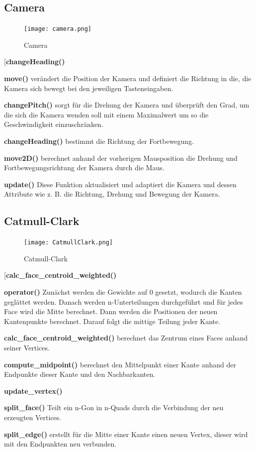 \subsection{Camera}
				
	\begin{figure}[H]
	\centering
	\texttt{[image: camera.png]}
	\caption{Camera}
	\label{fig3}
	\end{figure}

	\begin{labeling}[]{[\textbf{changeHeading()}}%
	\item[\textbf{move()}] verändert die Position der Kamera und definiert die Richtung in die, die Kamera sich bewegt bei den jeweiligen Tasteneingaben.
	\item[\textbf{changePitch()}] sorgt für die Drehung der Kamera und überprüft den Grad, um die sich die Kamera wenden soll mit einem Maximalwert um so die Geschwindigkeit einzuschränken.
	\item[\textbf{changeHeading()}] bestimmt die Richtung der Fortbewegung.
	\item[\textbf{move2D()}] berechnet anhand der vorherigen Mausposition die Drehung und Fortbewegungsrichtung der Kamera durch die Maus.
	\item[\textbf{update()}] Diese Funktion aktualisiert und adaptiert die Kamera und dessen Attribute wie z. B. die Richtung, Drehung und Bewegung der Kamera.
	\end{labeling}
	
\subsection{Catmull-Clark}


\begin{figure}[H]
	\centering
	\texttt{[image: CatmullClark.png]}
	\caption{Catmull-Clark}
	\label{fig4}
	\end{figure}

	\begin{labeling}[]{[\textbf{calc\_face\_centroid\_weighted()}}%
	\item[\textbf{operator()}] Zunächst werden die Gewichte auf 0 gesetzt, wodurch die Kanten geglättet werden. Danach werden n-Unterteilungen durchgeführt und für jedes Face wird die Mitte berechnet. Dann werden die Positionen der neuen Kantenpunkte berechnet. Darauf folgt die mittige Teilung jeder Kante.
	\item[\textbf{calc\_face\_centroid\_weighted()}] berechnet das Zentrum eines Faces anhand seiner Vertices.
	\item[\textbf{compute\_midpoint()}] berechnet den Mittelpunkt einer Kante anhand der Endpunkte dieser Kante und den Nachbarkanten.
	\item[\textbf{update\_vertex()}]
	\item[\textbf{split\_face()}] Teilt ein n-Gon in n-Quads durch die Verbindung der neu erzeugten Vertices.
	\item[\textbf{split\_edge()}] erstellt für die Mitte einer Kante einen neuen Vertex, dieser wird mit den Endpunkten neu verbunden.
	\end{labeling}

